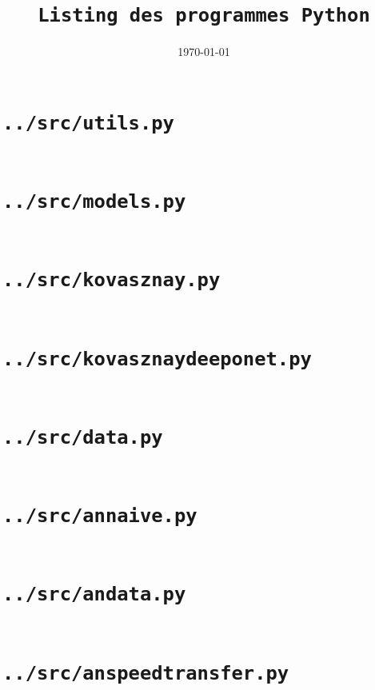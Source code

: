\documentclass[a4paper, 11pt]{article}
\newcommand{\fichier}[1]{%
  \section{\texttt{#1}}%
  \inputminted{python}{#1}%
}
\begin{document}
\title{\texttt{Listing des programmes Python}}
\author{}
\date{\today}
\maketitle

\tableofcontents
\newpage

\fichier{../src/utils.py}
\fichier{../src/models.py}
\fichier{../src/kovasznay.py}
\fichier{../src/kovasznaydeeponet.py}
\fichier{../src/data.py}
\fichier{../src/annaive.py}
\fichier{../src/andata.py}
\fichier{../src/anspeedtransfer.py}
\end{document}
